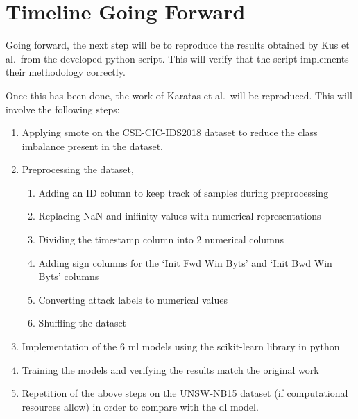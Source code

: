 \chapter{Timeline Going Forward}%
\label{chp:timeline}

Going forward, the next step will be to reproduce the results obtained by Kus
et al.\ from the developed python script. This will verify that the script
implements their methodology correctly.

Once this has been done, the work of Karatas et al.\ will be reproduced. This
will involve the following steps:
\begin{enumerate}
      \item Applying \gls{smote} on the CSE-CIC-IDS2018 dataset to reduce the class
            imbalance present in the dataset.
      \item Preprocessing the dataset,
            \begin{enumerate}
                  \item Adding an ID column to keep track of samples during preprocessing
                  \item Replacing NaN and inifinity values with numerical representations
                  \item Dividing the timestamp column into 2 numerical columns
                  \item Adding sign columns for the `Init Fwd Win Byts' and `Init Bwd Win Byts' columns
                  \item Converting attack labels to numerical values
                  \item Shuffling the dataset
            \end{enumerate}
      \item Implementation of the 6 \gls{ml} models using the scikit-learn library in
            python
      \item Training the models and verifying the results match the original work
      \item Repetition of the above steps on the UNSW-NB15 dataset (if computational
            resources allow) in order to compare with the \gls{dl} model.
\end{enumerate}

